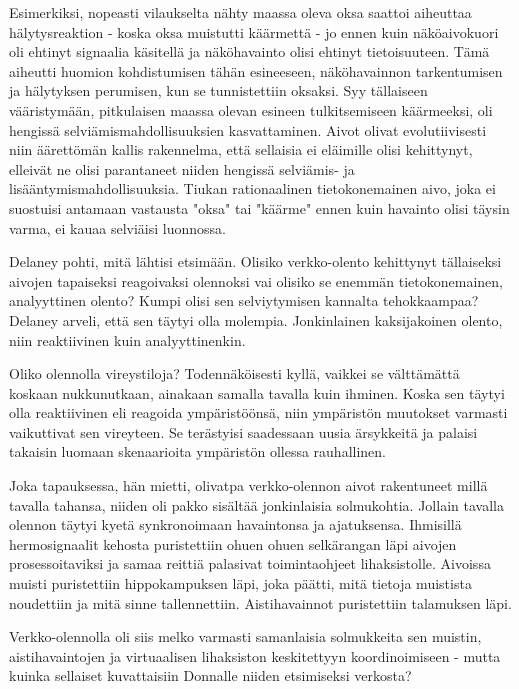 Esimerkiksi, nopeasti vilaukselta nähty maassa oleva oksa saattoi aiheuttaa hälytysreaktion - koska oksa muistutti käärmettä - jo ennen kuin näköaivokuori oli ehtinyt signaalia käsitellä ja näköhavainto olisi ehtinyt tietoisuuteen. Tämä aiheutti huomion kohdistumisen tähän esineeseen, näköhavainnon tarkentumisen ja hälytyksen perumisen, kun se tunnistettiin oksaksi. Syy tällaiseen vääristymään, pitkulaisen maassa olevan esineen tulkitsemiseen käärmeeksi, oli hengissä selviämismahdollisuuksien kasvattaminen. Aivot olivat evolutiivisesti niin äärettömän kallis rakennelma, että sellaisia ei eläimille olisi kehittynyt, elleivät ne olisi parantaneet niiden hengissä selviämis- ja lisääntymismahdollisuuksia. Tiukan rationaalinen tietokonemainen aivo, joka ei suostuisi antamaan vastausta "oksa" tai "käärme" ennen kuin havainto olisi täysin varma, ei kauaa selviäisi luonnossa.


Delaney pohti, mitä lähtisi etsimään. Olisiko verkko-olento kehittynyt tällaiseksi aivojen tapaiseksi reagoivaksi olennoksi vai olisiko se enemmän tietokonemainen, analyyttinen olento? Kumpi olisi sen selviytymisen kannalta tehokkaampaa? Delaney arveli, että sen täytyi olla molempia. Jonkinlainen kaksijakoinen olento, niin reaktiivinen kuin analyyttinenkin.


Oliko olennolla vireystiloja? Todennäköisesti kyllä, vaikkei se välttämättä koskaan nukkunutkaan, ainakaan samalla tavalla kuin ihminen. Koska sen täytyi olla reaktiivinen eli reagoida ympäristöönsä, niin ympäristön muutokset varmasti vaikuttivat sen vireyteen. Se terästyisi saadessaan uusia ärsykkeitä ja palaisi takaisin luomaan skenaarioita ympäristön ollessa rauhallinen.


Joka tapauksessa, hän mietti, olivatpa verkko-olennon aivot rakentuneet millä tavalla tahansa, niiden oli pakko sisältää jonkinlaisia solmukohtia. Jollain tavalla olennon täytyi kyetä synkronoimaan havaintonsa ja ajatuksensa. Ihmisillä hermosignaalit kehosta puristettiin ohuen ohuen selkärangan läpi aivojen prosessoitaviksi ja samaa reittiä palasivat toimintaohjeet lihaksistolle. Aivoissa muisti puristettiin hippokampuksen läpi, joka päätti, mitä tietoja muistista noudettiin ja mitä sinne tallennettiin. Aistihavainnot puristettiin talamuksen läpi.


Verkko-olennolla oli siis melko varmasti samanlaisia solmukkeita sen muistin, aistihavaintojen ja virtuaalisen lihaksiston keskitettyyn koordinoimiseen - mutta kuinka sellaiset kuvattaisiin Donnalle niiden etsimiseksi verkosta?




